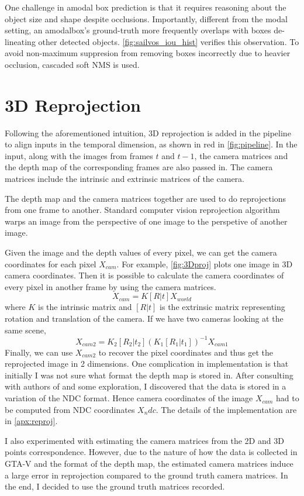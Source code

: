 One challenge in amodal box prediction is that it requires reasoning about the object size and shape despite occlusions. Importantly, different from the modal setting, an amodalbox’s ground-truth more frequently overlaps with boxes de-lineating other detected objects. \ref{fig:sailvos_iou_hist} verifies this observation. To avoid non-maximum suppresion from removing boxes incorrectly due to heavier occlusion, cascaded soft NMS is used.




\section{3D Reprojection}
Following the aforementioned intuition, 3D reprojection is added in the pipeline to align inputs in the temporal dimension, as shown in red in \ref{fig:pipeline}. In the input, along with the images from frames $t$ and $t-1$, the camera matrices and the depth map of the corresponding frames are also passed in. The camera matrices include the intrinsic and extrinsic matrices of the camera.

The depth map and the camera matrices together are used to do reprojections from one frame to another. Standard computer vision reprojection algorithm warps an image from the perspective of one image to the perspetive of another image.

Given the image and the depth values of every pixel, we can get the camera coordinates for each pixel $X_{cam}$. For example, \ref{fig:3Dproj} plots one image in 3D camera coordinates. Then it is possible to calculate the camera coordinates of every pixel in another frame by using the camera matrices. $$ X_{cam} = K[R|t]X_{world} $$ where $K$ is the intrinsic matrix and $[R|t]$ is the extrinsic matrix representing rotation and translation of the camera. If we have two cameras looking at the same scene, $$X_{cam2} = K_2[R_2|t_2](K_1[R_1|t_1])^{-1}X_{cam1}$$ Finally, we can use $X_{cam2}$ to recover the pixel coordinates and thus get the reprojected image in 2 dimensions. One complication in implementation is that initially I was not sure what format the depth map is stored in. After consulting with authors of \cite{hu2019sail} and some exploration, I discovered that the data is stored in a variation of the NDC format. Hence camera coordinates of the image $X_{cam}$ had to be computed from NDC coordinates $X_ndc$. The details of the implementation are in \ref{apx:reproj}. 

I also experimented with estimating the camera matrices from the 2D and 3D points correspondence. However, due to the nature of how the data is collected in GTA-V and the format of the depth map, the estimated camera matrices induce a large error in reprojection compared to the ground truth camera matrices. In the end, I decided to use the ground truth matrices recorded. 

